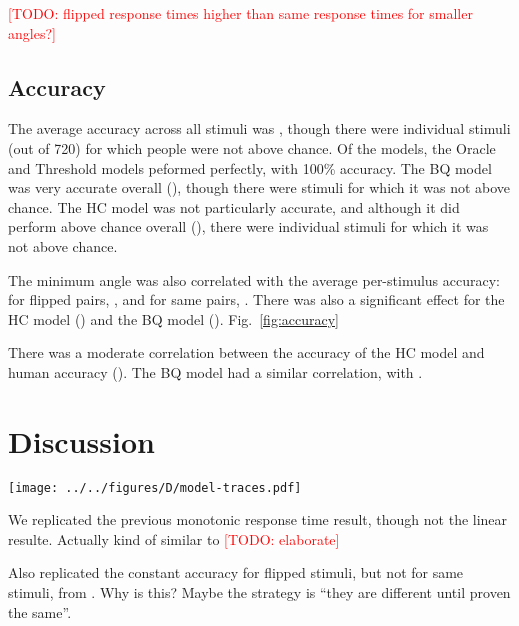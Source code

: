 \documentclass[10pt,letterpaper]{article}
\newcommand{\TODO}[1]{\textcolor{red}{[TODO: #1]}}
\newcommand{\Oc}[0]{Oracle}
\newcommand{\Th}[0]{Threshold}
\newcommand{\Hc}[0]{HC}
\newcommand{\Bq}[0]{BQ}
\begin{document}
\TODO{flipped response times higher than same response times for
  smaller angles?}

\subsection{Accuracy}

The average accuracy across all stimuli was \ExpAccuracy{}, though
there were \ExpNumChance{} individual stimuli (out of 720) for which
people were not above chance. Of the models, the \Oc{} and \Th{}
models peformed perfectly, with 100\% accuracy. The \Bq{} model was
very accurate overall (\BqAccuracy{}), though there were
\BqNumChance{} stimuli for which it was not above chance. The \Hc{}
model was not particularly accurate, and although it did perform above
chance overall (\HcAccuracy{}), there were \HcNumChance{} individual
stimuli for which it was not above chance.

The minimum angle was also correlated with the average per-stimulus
accuracy: for flipped pairs, \ExpThetaAccuracyCorrFlipped{}, and for
same pairs, \ExpThetaAccuracyCorrSame{}. There was also a significant
effect for the \Hc{} model (\HcThetaAccuracyCorr{}) and the
\Bq{} model
(\BqThetaAccuracyCorr{}). Fig.~\ref{fig:accuracy}

There was a moderate correlation between the accuracy of the \Hc{}
model and human accuracy (\ExpHcAccuracyCorr{}). The \Bq{} model had a
similar correlation, with \ExpBqAccuracyCorr{}.


\section{Discussion}

\begin{figure*}[t]
  \begin{center}
    \texttt{[image: ../../figures/D/model-traces.pdf]}
    \caption{\textbf{Model traces.} \TODO{} \TODO{put pictures of the
        stimuli here}}
    \label{fig:model-traces}
  \end{center}
\end{figure*}

We replicated the previous monotonic response time result, though not
the linear resulte. Actually kind of similar to \cite{Gardony:2013gn}
\TODO{elaborate}

Also replicated the constant accuracy for flipped stimuli, but not for
same stimuli, from \cite{Cooper:1975wp}. Why is this? Maybe the
strategy is ``they are different until proven the same''.
\end{document}
